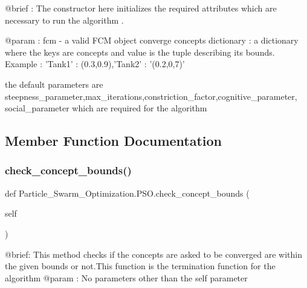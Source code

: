 \begin{DoxyVerb}@brief : The constructor here initializes the required attributes which are necessary to run the algorithm .

@param : fcm - a valid FCM object
     converge concepts dictionary : a dictionary where the keys are concepts and value is the
     tuple describing its bounds. Example : {'Tank1' : (0.3,0.9),'Tank2' : '(0.2,0,7)'}

     the default parameters are steepness_parameter,max_iterations,constriction_factor,cognitive_parameter,
     social_parameter which are required for the algorithm\end{DoxyVerb}
 

\subsection{Member Function Documentation}
\hypertarget{class_particle___swarm___optimization_1_1_p_s_o_a26c6af0753a8c0508b2f3d1a727537a7}{}\label{class_particle___swarm___optimization_1_1_p_s_o_a26c6af0753a8c0508b2f3d1a727537a7} 
\subsubsection{\texorpdfstring{check\+\_\+concept\+\_\+bounds()}{check\_concept\_bounds()}}
{\footnotesize\ttfamily def Particle\+\_\+\+Swarm\+\_\+\+Optimization.\+P\+S\+O.\+check\+\_\+concept\+\_\+bounds (\begin{DoxyParamCaption}\item[{}]{self }\end{DoxyParamCaption})}

\begin{DoxyVerb}@brief: This method checks if the concepts are asked to be converged are within the given bounds or not.This function is the
    termination function for the algorithm
@param  : No parameters other than the self parameter
\end{DoxyVerb}
 \hypertarget{class_particle___swarm___optimization_1_1_p_s_o_aadc88450078ac4c483d890a87dee9b0e}{}\label{class_particle___swarm___optimization_1_1_p_s_o_aadc88450078ac4c483d890a87dee9b0e} 
